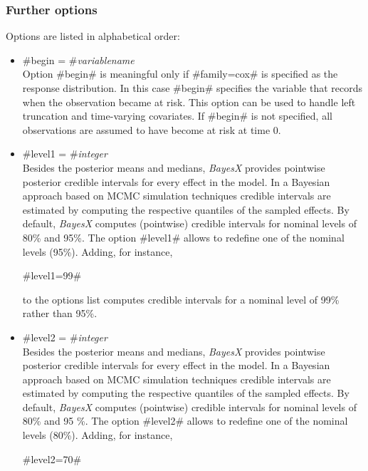 \subsubsection*{Further options} \label{further options}

Options are listed in alphabetical order:

  
\begin{itemize}
\item #begin = #{\em variablename} \\
Option #begin# is meaningful only if #family=cox# is specified as
the response distribution. In this case #begin# specifies the
variable that records when the observation became at risk. This
option can be used to handle left truncation and time-varying
covariates. If #begin# is not specified, all observations are
assumed to have become at risk at time 0.

\item \label{level1} #level1 = #{\em integer} \\
Besides the posterior means and medians, {\em BayesX} provides
pointwise posterior credible intervals for every effect in the
model. In a Bayesian approach based on MCMC simulation techniques
credible intervals are estimated by computing the respective
quantiles of the sampled effects. By default, {\em BayesX}
computes (pointwise) credible intervals for nominal levels of 80\%
and 95\%. The option #level1# allows to redefine one of the
nominal levels (95\%). Adding, for instance,

#level1=99#

to the options list computes credible intervals for a nominal
level of 99\% rather than 95\%.

\item \label{level2} #level2 = #{\em integer} \\
Besides the posterior means and medians, {\em BayesX} provides
pointwise posterior credible intervals for every effect in the
model. In a Bayesian approach based on MCMC simulation techniques
credible intervals are estimated by computing the respective
quantiles of the sampled effects. By default, {\em BayesX}
computes (pointwise) credible intervals for nominal levels of 80\%
and 95 \%. The option #level2# allows to redefine one of the
nominal levels (80\%). Adding, for instance,

#level2=70#


\end{itemize}
